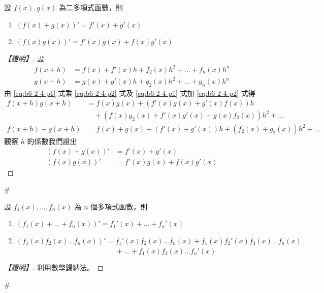 \begin{theorem}\label{thm:b6-2-diff-rules}
設 $f(x), g(x)$ 為二多項式函數，則
\begin{enumerate}[label=(\arabic*), leftmargin=2em]
  \item $(f(x)+g(x))' = f'(x) + g'(x)$
  \item $(f(x)g(x))' = f'(x)g(x) + f(x)g'(x)$
\end{enumerate}
\end{theorem}

\begin{proof}[【證明】]
設
\begin{align}
f(x+h) &= f(x) + f'(x)h + f_2(x)h^2 + \dots + f_n(x)h^n \label{eq:b6-2-4-p1} \\
g(x+h) &= g(x) + g'(x)h + g_2(x)h^2 + \dots + g_n(x)h^n \label{eq:b6-2-4-p2}
\end{align}
由 \eqref{eq:b6-2-4-p1} 式乘 \eqref{eq:b6-2-4-p2} 式及 \eqref{eq:b6-2-4-p1} 式加 \eqref{eq:b6-2-4-p2} 式得
\begin{align*}
f(x+h)g(x+h) &= f(x)g(x) + (f'(x)g(x) + g'(x)f(x))h \\
&\quad + (f(x)g_2(x) + f'(x)g'(x) + g(x)f_2(x))h^2 + \dots \\
f(x+h)+g(x+h) &= f(x)+g(x) + (f'(x)+g'(x))h + (f_2(x)+g_2(x))h^2 + \dots
\end{align*}
觀察 $h$ 的係數我們證出
\begin{align*}
(f(x)+g(x))' &= f'(x) + g'(x) \\
(f(x)g(x))' &= f'(x)g(x) + f(x)g'(x)
\end{align*}
\end{proof}\hfill$\#$

\begin{corollary}\label{cor:b6-2-diff-multi}
設 $f_1(x), \dots, f_n(x)$ 為 $n$ 個多項式函數，則
\begin{enumerate}[label=(\arabic*), leftmargin=2em]
  \item $(f_1(x)+\dots+f_n(x))' = f_1'(x) + \dots + f_n'(x)$
  \item $(f_1(x)f_2(x)\dots f_n(x))' = f_1'(x)f_2(x)\dots f_n(x) + f_1(x)f_2'(x)f_3(x)\dots f_n(x)$ \\
  $\phantom{(f_1(x)f_2(x)\dots f_n(x))' ={}} + \dots + f_1(x)f_2(x)\dots f_n'(x)$
\end{enumerate}
\end{corollary}

\begin{proof}[【證明】]
利用數學歸納法。
\end{proof}\hfill$\#$

